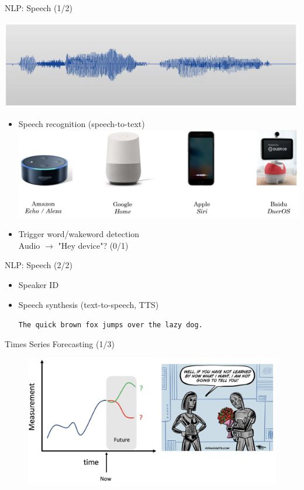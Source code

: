 \documentclass[pdf]{beamer}
\theoremstyle{mystyle}
\begin{document}
\begin{frame}{NLP: Speech (1/2)}
	\begin{center}
		\includegraphics[scale=.25]{speech-1}
	\end{center}
	\begin{itemize}
		\item Speech recognition (speech-to-text) \\
		\includegraphics[scale=.2]{smart-speakers}
		\item<2-> Trigger word/wakeword detection \\
		Audio $\longrightarrow$ "Hey device"? (0/1)
	\end{itemize}
\end{frame}

\begin{frame}{NLP: Speech (2/2)}
	\begin{itemize}
		\item Speaker ID

		\bigskip

		\item<2-> Speech synthesis (text-to-speech, TTS)
		\begin{center}
			\texttt{The quick brown fox jumps over the lazy dog.}	
		\end{center}						
	\end{itemize}
\end{frame}

\begin{frame}{Times Series Forecasting (1/3)}
\begin{figure}[!ht]
		\centering
		\includegraphics[scale=.25]{images/time-series-forecasting}
	\end{figure}		
\end{frame}
\end{document}
